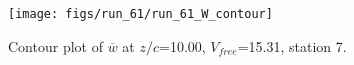 \begin{figure}[H]
\centering
\texttt{[image: figs/run\_61/run\_61\_W\_contour]}
\caption{Contour plot of $\overline{w}$ at $z/c$=10.00, $V_{free}$=15.31, station 7.}
\end{figure}


